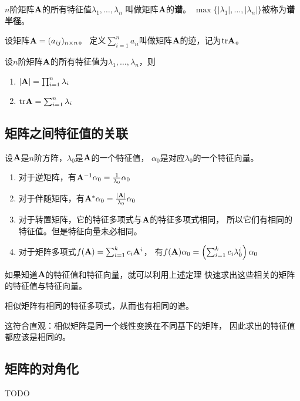 \begin{definition}[矩阵的谱]
  $n$阶矩阵$\mathbf{A}$的所有特征值$\lambda_1,\dots,\lambda_n$
  叫做矩阵$\mathbf{A}$的\textbf{谱}。
  $\max\{|\lambda_1|,\dots,|\lambda_n|\}$被称为\textbf{谱半径}。
\end{definition}

\begin{definition}[矩阵的迹]
  设矩阵$\mathbf{A}=(a_{ij})_{n\times n}$。
  定义$\sum_{i=1}^{n}a_{ii}$叫做矩阵$\mathbf{A}$的迹，记为$\textrm{tr}\mathbf{A}$。
\end{definition}

\begin{theorem}[特征值的性质]
  设$n$阶矩阵$\mathbf{A}$的所有特征值为$\lambda_1,\dots,\lambda_n$，则
  \begin{enumerate}
    \item $|\mathbf{A}| = \prod_{i=1}^{n}\lambda_i$
    \item $\textrm{tr}\mathbf{A} = \sum_{i=1}^{n}\lambda_i$
  \end{enumerate}
\end{theorem}

\subsection{矩阵之间特征值的关联}
\begin{theorem}[矩阵运算对特征值和特征向量的影响]
  设$\mathbf{A}$是$n$阶方阵，$\lambda_0$是$\mathbf{A}$的一个特征值，
  $\alpha_0$是对应$\lambda_0$的一个特征向量。
  \begin{enumerate}
    \item
    对于逆矩阵，有$\mathbf{A}^{-1}\alpha_0 = \frac{1}{\lambda_0}\alpha_0$
    \item
    对于伴随矩阵，有$\mathbf{A}^*\alpha_0 = \frac{|\mathbf{A}|}{\lambda_0}\alpha_0$
    \item
    对于转置矩阵，它的特征多项式与$\mathbf{A}$的特征多项式相同，
    所以它们有相同的特征值。但是特征向量未必相同。
    \item
    对于矩阵多项式$f(\mathbf{A})=\sum_{i=1}^{k} c_i\mathbf{A}^i$，
    有$f(\mathbf{A})\alpha_0=\left(\sum_{i=1}^{k} c_i\lambda_0^i\right)\alpha_0$
  \end{enumerate}
\end{theorem}

\begin{remark}
  如果知道$\mathbf{A}$的特征值和特征向量，就可以利用上述定理
  快速求出这些相关的矩阵的特征值与特征向量。
\end{remark}

\begin{theorem}[相似矩阵之间特征值的联系]
  相似矩阵有相同的特征多项式，从而也有相同的谱。
\end{theorem}

\begin{remark}
  这符合直观：相似矩阵是同一个线性变换在不同基下的矩阵，
  因此求出的特征值都应该是相同的。
\end{remark}

\subsection{矩阵的对角化}
TODO

